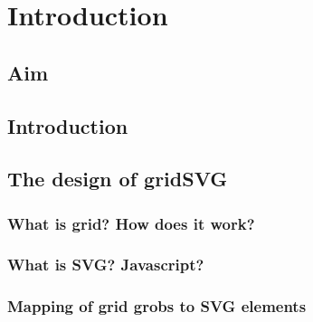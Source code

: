 \chapter{Introduction}

\section{Aim}


\section{Introduction}


\section{The design of gridSVG}

\subsection{What is grid? How does it work?}

\subsection{What is SVG? Javascript?}

\subsection{Mapping of grid grobs to SVG elements}

